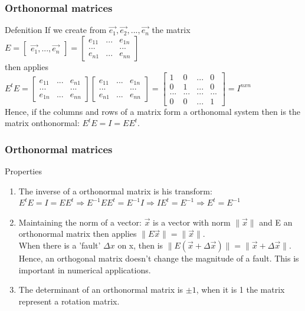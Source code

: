 \begin{frame}
	\frametitle{Orthonormal matrices}
	\begin{block}{Defenition}
		If we create from $\overrightarrow{e_1},\overrightarrow{e_2},...,\overrightarrow{e_n}$ the matrix \\
		$E=\begin{bmatrix} \overrightarrow{e_1},...,\overrightarrow{e_n}\end{bmatrix}=\begin{bmatrix} 
		e_{11} & ... & e_{1n}\\
		... & & ...\\
		e_{n1} & ... & e_{nn}\end{bmatrix}$ \\
		then applies\\
		$E^tE=\begin{bmatrix} 
		e_{11} & ... & e_{n1}\\
		... & & ...\\
		e_{1n} & ... & e_{nn}\end{bmatrix}\begin{bmatrix} 
		e_{11} & ... & e_{1n}\\
		... & & ...\\
		e_{n1} & ... & e_{nn}\end{bmatrix}=\begin{bmatrix} 
		1 & 0 & ... & 0\\
		0 & 1 & ... & 0\\
		... & ... & ... & ...\\
		0 & 0 & ... & 1\end{bmatrix}=I^{nxn}$\\
		Hence, if the columns and rows of a matrix form a orthonomal system then is the matrix onthonormal: $E^tE=I=EE^t$.
	\end{block}
\end{frame}

\begin{frame}
	\frametitle{Orthonormal matrices}
	\begin{block}{Properties}
		\begin{enumerate}
			\item The inverse of a orthonormal matrix is his transform:\\
			$E^tE=I=EE^t \Rightarrow E^{-1}EE^t=E^{-1}I \Rightarrow IE^t=E^{-1} \Rightarrow E^t=E^{-1}$
			\item Maintaining the norm of a vector: $\overrightarrow{x}$ is a vector with norm $\|\overrightarrow{x}\|$ and E an orthonormal matrix then applies $\|E\overrightarrow{x}\|=\|\overrightarrow{x}\|$.\\
			When there is a 'fault' $\Delta x$ on x, then is $\|E(\overrightarrow{x}+\Delta\overrightarrow{x})\|=\|\overrightarrow{x}+\Delta\overrightarrow{x}\|$.\\
			Hence, an orthogonal matrix doesn't change the magnitude of a fault. This is important in numerical applications.
			\item The determinant of an orthonormal matrix is $\pm1$, when it is 1 the matrix represent a rotation matrix.
		\end{enumerate}
	\end{block}
\end{frame}

